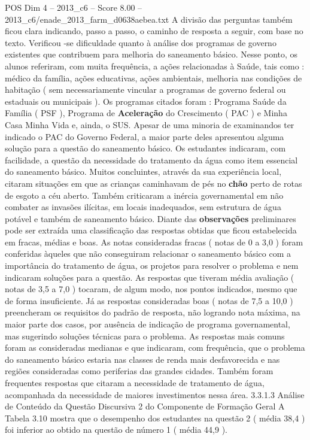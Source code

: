 \begin{textsample}{POS Dim 4 – 2013\_c6 – Score 8.00 – 2013\_c6/enade\_2013\_farm\_d0638aebea.txt}
A divisão das perguntas também ficou clara indicando, passo a passo, o caminho de resposta a seguir, com base no texto.
Verificou -se dificuldade quanto à análise dos programas de governo existentes que contribuem para melhoria do saneamento básico.
Nesse ponto, os alunos referiram, com muita frequência, a ações relacionadas à Saúde, tais como : médico da família, ações educativas, ações ambientais, melhoria nas condições de habitação ( sem necessariamente vincular a programas de governo federal ou estaduais ou municipais ).
Os programas citados foram : Programa Saúde da Família ( PSF ), Programa de \textbf{Aceleração} do Crescimento ( PAC ) e Minha Casa Minha Vida e, ainda, o SUS.
Apesar de uma minoria de examinandos ter indicado o PAC do Governo Federal, a maior parte deles apresentou alguma solução para a questão do saneamento básico.
Os estudantes indicaram, com facilidade, a questão da necessidade do tratamento da água como item essencial do saneamento básico.
Muitos concluintes, através da sua experiência local, citaram situações em que as crianças caminhavam de pés no \textbf{chão} perto de rotas de esgoto a céu aberto.
Também criticaram a inércia governamental em não combater as invasões ilícitas, em locais inadequados, sem estrutura de água potável e também de saneamento básico.
Diante das \textbf{observações} preliminares pode ser extraída uma classificação das respostas obtidas que ficou estabelecida em fracas, médias e boas.
As notas consideradas fracas ( notas de 0 a 3,0 ) foram conferidas àqueles que não conseguiram relacionar o saneamento básico com a importância do tratamento de água, os projetos para resolver o problema e nem indicaram soluções para a questão.
As respostas que tiveram média avaliação ( notas de 3,5 a 7,0 ) tocaram, de algum modo, nos pontos indicados, mesmo que de forma insuficiente.
Já as respostas consideradas boas ( notas de 7,5 a 10,0 ) preencheram os requisitos do padrão de resposta, não logrando nota máxima, na maior parte dos casos, por ausência de indicação de programa governamental, mas sugerindo soluções técnicas para o problema.
As respostas mais comuns foram as consideradas medianas e que indicaram, com frequência, que o problema do saneamento básico estaria nas classes de renda mais desfavorecida e nas regiões consideradas como periferias das grandes cidades.
Também foram frequentes respostas que citaram a necessidade de tratamento de água, acompanhada da necessidade de maiores investimentos nessa área. 3.3.1.3 Análise de Conteúdo da Questão Discursiva 2 do Componente de Formação Geral A Tabela 3.10 mostra que o desempenho dos estudantes na questão 2 ( média 38,4 ) foi inferior ao obtido na questão de número 1 ( média 44,9 ).

\end{textsample}

